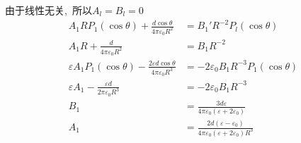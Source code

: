 由于线性无关, \,所以$A_{l}=B_{l}=0$
\begin{align*}
    A_1 R
P_1(\cos\theta)
+\frac{d\cos\theta}{4\pi\varepsilon_0R^2}&=
B_1' R^{-2}
P_l(\cos\theta)\\
A_1 R
+\frac{d}{4\pi\varepsilon_0R^2}&=
B_1 R^{-2}\\
\varepsilon A_1 P_1(\cos\theta)
- \frac{2\varepsilon d\cos\theta}{4\pi\varepsilon_0R^3}&=-2\varepsilon_0B_1 R^{-3}
P_1(\cos\theta)\\
\varepsilon A_1
- \frac{\varepsilon d}{2\pi\varepsilon_0R^3}&=-2\varepsilon_0B_1 R^{-3}\\
B_1&=\frac{3d\varepsilon}{4\pi\varepsilon_0(\varepsilon+2\varepsilon_0)}\\
A_1&=\frac{2d(\varepsilon-\varepsilon_0)}{4\pi\varepsilon_0(\varepsilon+2\varepsilon_0)R^3}
\end{align*}

\newpage